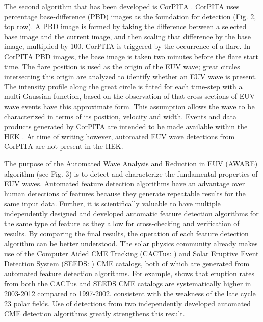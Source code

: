 The second algorithm that has been developed is CorPITA
\citep{2014SoPh..289.3279L}. CorPITA uses percentage base-difference
(PBD) images as the foundation for detection (Fig. 2, top row).  A PBD
image is formed by taking the difference between a selected base image
and the current image, and then scaling that difference by the base
image, multiplied by 100.  CorPITA is triggered by the occurrence of a
flare.  In CorPITA PBD images, the base image is taken two minutes
before the flare start time. The flare position is used as the origin
of the EUV wave; great circles intersecting this origin are analyzed
to identify whether an EUV wave is present. The intensity profile
along the great circle is fitted for each time-step with a
multi-Gaussian function, based on the observation of
\cite{2006ApJ...645..757W} that cross-sections of EUV wave events have
this approximate form. This assumption allows the wave to be
characterized in terms of its position, velocity and width. Events and
data products generated by CorPITA are intended to be made available
within the HEK \citep{hek2012, 2012SoPh..275...79M}.  At time of
writing however, automated EUV wave detections from CorPITA are not
present in the HEK.
 
The purpose of the Automated Wave Analysis and Reduction in EUV
(AWARE) algorithm (see Fig. 3) is to detect and characterize the
fundamental properties of EUV waves.  Automated feature detection
algorithms have an advantage over human detections of features because
they generate repeatable results for the same input data.  Further, it
is scientifically valuable to have multiple independently designed and
developed automatic feature detection algorithms for the same type of
feature as they allow for cross-checking and verification of results.
By comparing the final results, the operation of each feature
detection algorithm can be better understood.  The solar physics
community already makes use of the Computer Aided CME Tracking
(CACTus: \cite{2004A&A...425.1097R}) and Solar Eruptive Event
Detection System (SEEDS: \cite{2008SoPh..248..485O}) CME catalogs,
both of which are generated from automated feature detection
algorithms.  For example, \cite{2013ApJ...768..162P} shows that
eruption rates from both the CACTus and SEEDS CME catalogs are
systematically higher in 2003-2012 compared to 1997-2002, consistent
with the weakness of the late cycle 23 polar fields.  Use of
detections from two independently developed automated CME detection
algorithms greatly strengthens this result.

